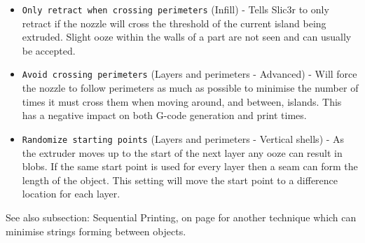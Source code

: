 \begin{itemize}
    \item \texttt{Only retract when crossing perimeters} (Infill) - Tells Slic3r to only retract if the nozzle will cross the threshold of the current island being extruded.  Slight ooze within the walls of a part are not seen and can usually be accepted.
    \item \texttt{Avoid crossing perimeters} (Layers and perimeters - Advanced) - Will force the nozzle to follow perimeters as much as possible to minimise the number of times it must cross them when moving around, and between, islands.  This has a negative impact on both G-code generation and print times.
    \item \texttt{Randomize starting points} (Layers and perimeters - Vertical shells) - As the extruder moves up to the start of the next layer any ooze can result in blobs.  If the same start point is used for every layer then a seam can form the length of the object.  This setting will move the start point to a difference location for each layer.
\end{itemize}


See also subsection: Sequential Printing, on page \pageref{sec:sequential_printing} for another technique which can minimise strings forming between objects.
